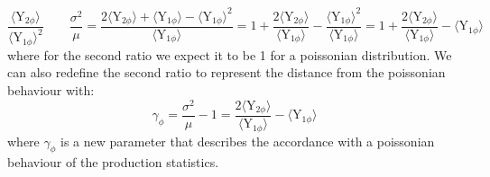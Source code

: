 \begin{equation}
\frac{\langle \text{Y}_{2\phi} \rangle} {\langle \text{Y}_{1\phi} \rangle^2}\qquad \frac{\sigma^2}{\mu} = \frac{2\langle \text{Y}_{2\phi} \rangle + \langle \text{Y}_{1\phi} \rangle - \langle \text{Y}_{1\phi} \rangle^2}{\langle \text{Y}_{1\phi} \rangle} = 1 + \frac{2\langle \text{Y}_{2\phi} \rangle}{\langle \text{Y}_{1\phi} \rangle} - \frac{ \langle \text{Y}_{1\phi} \rangle^2}{\langle \text{Y}_{1\phi} \rangle} = 1 + \frac{2\langle \text{Y}_{2\phi} \rangle}{\langle \text{Y}_{1\phi} \rangle} - \langle \text{Y}_{1\phi} \rangle
\label{eq:}
\end{equation}
where for the second ratio we expect it to be 1 for a poissonian distribution. We can also redefine the second ratio to represent the distance from the poissonian behaviour with:
 \begin{equation}
\gamma_{\phi} =  \frac{\sigma^2}{\mu} - 1 = \frac{2\langle \text{Y}_{2\phi} \rangle}{\langle \text{Y}_{1\phi} \rangle} - \langle \text{Y}_{1\phi} \rangle
\label{eq:}
\end{equation}
where $\gamma_\phi$ is a new parameter that describes the accordance with a poissonian behaviour of the production statistics. 
